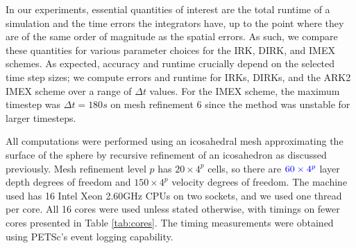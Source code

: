 \documentclass[a4paper, 12pt]{article}
\newcommand{\revisedA}[1]{#1}
\newcommand{\revisedus}[1]{#1}
\newcommand{\revisedC}[1]{{\color{blue}#1}}
\begin{document}
In our experiments, essential quantities of interest are the total runtime of a
simulation and the time errors the integrators have, up to the point
where they are of the same order of magnitude as the spatial
errors. As such, we compare these quantities for various parameter
choices for the IRK, \revisedA{DIRK,} and IMEX schemes. As expected, accuracy and
runtime crucially depend on the selected time step sizes; we compute
errors and runtime for IRKs, \revisedA{DIRKs,} and the ARK2 IMEX scheme over a range of
$\Delta t$ values. For the IMEX scheme, the maximum timestep was
\revisedus{$\Delta t=180s$} on mesh {refinement} 6 since the method was unstable
for larger timesteps.


All computations were performed using an icosahedral mesh
approximating the surface of the sphere by recursive refinement of an
icosahedron as discussed previously. {Mesh refinement level $p$}
 has $20\times 4^p$ cells, so there are $\revisedC{60\times 4^p}$ layer depth degrees
 of freedom and $150\times 4^p$ velocity degrees of freedom. The
 machine used has 16 Intel Xeon 2.60GHz CPUs on two sockets, and we
 used one thread per core. All 16 cores were used unless stated
 otherwise, with timings on fewer cores presented in Table
 \ref{tab:cores}.  The timing measurements were obtained using PETSc's
 event logging capability.
\end{document}
